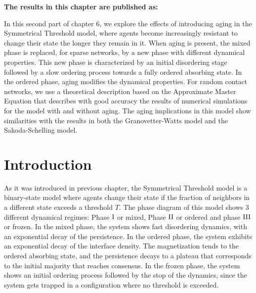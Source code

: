 \vspace{-1.5cm}
\small
\textbf{The results in this chapter are published as:}
\vspace{0.05 cm}

\normalsize
\vspace{0.5 cm}

In this second part of chapter 6, we explore the effects of introducing aging in the Symmetrical Threshold model, where agents become increasingly resistant to change their state the longer they remain in it. When aging is present, the mixed phase is replaced, for sparse networks, by a new phase with different dynamical properties. This new phase is characterized by an initial disordering stage followed by a slow ordering process towards a fully ordered absorbing state. In the ordered phase, aging modifies the dynamical properties. For random contact networks, we use a theoretical description based on the Approximate Master Equation that describes with good accuracy the results of numerical simulations for the model with and without aging. The aging implications in this model show similarities with the results in both the Granovetter-Watts model and the Sakoda-Schelling model.

\section{\label{sec:Introduction_Chapter6} Introduction}

As it was introduced in previous chapter, the Symmetrical Threshold model is a binary-state model where agents change their state if the fraction of neighbors in a different state exceeds a threshold $T$. The phase diagram of this model shows 3 different dynamical regimes: Phase ${\rm I}$ or mixed, Phase ${\rm II}$ or ordered and phase ${\rm III}$ or frozen. In the mixed phase, the system shows fast disordering dynamics, with an exponential decay of the persistence. In the ordered phase, the system exhibits an exponential decay of the interface density. The magnetization tends to the ordered absorbing state, and the persistence decays to a plateau that corresponds to the initial majority that reaches consensus. In the frozen phase, the system shows an initial ordering process followed by the stop of the dynamics, since the system gets trapped in a configuration where no threshold is exceeded.


